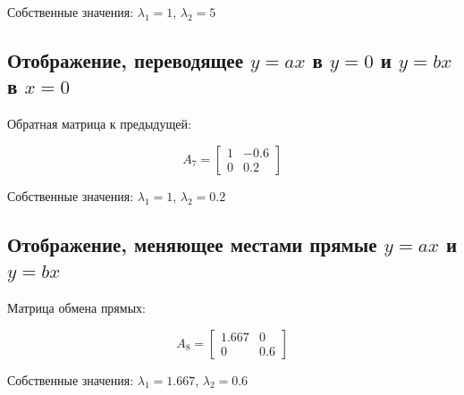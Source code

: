 Собственные значения: $\lambda_1 = 1$, $\lambda_2 = 5$

\subsection*{Отображение, переводящее $y = ax$ в $y = 0$ и $y = bx$ в $x = 0$}

Обратная матрица к предыдущей:

\begin{equation}
A_7 = \begin{bmatrix} 1 & -0.6 \\ 0 & 0.2 \end{bmatrix}
\end{equation}

Собственные значения: $\lambda_1 = 1$, $\lambda_2 = 0.2$

\subsection*{Отображение, меняющее местами прямые $y = ax$ и $y = bx$}

Матрица обмена прямых:

\begin{equation}
A_8 = \begin{bmatrix} 1.667 & 0 \\ 0 & 0.6 \end{bmatrix}
\end{equation}

Собственные значения: $\lambda_1 = 1.667$, $\lambda_2 = 0.6$

